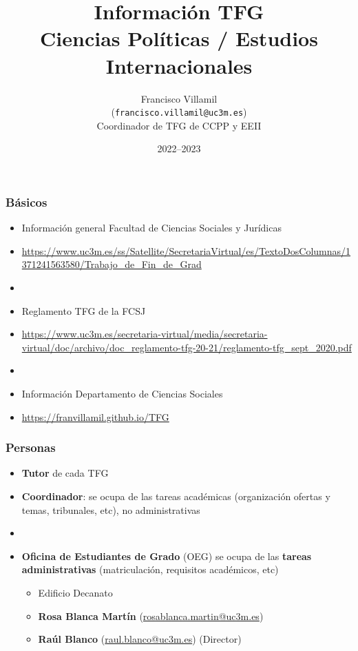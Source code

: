 \documentclass[utf8, xcolor=dvipsnames]{beamer}
\title[]{Información TFG\\Ciencias Políticas / Estudios Internacionales}
\author[]{Francisco Villamil\\(\texttt{francisco.villamil@uc3m.es})\\Coordinador de TFG de CCPP y EEII}
\date[]{2022--2023}
\begin{document}
\begin{frame}
  \titlepage
\end{frame}


\begin{frame}
\frametitle{Básicos}
\centering

\begin{itemize}
  \item Información general Facultad de Ciencias Sociales y Jurídicas
  \item[] {\footnotesize \url{https://www.uc3m.es/ss/Satellite/SecretariaVirtual/es/TextoDosColumnas/1371241563580/Trabajo_de_Fin_de_Grad}}
  \item[]
  \item Reglamento TFG de la FCSJ
  \item[] {\footnotesize \url{https://www.uc3m.es/secretaria-virtual/media/secretaria-virtual/doc/archivo/doc_reglamento-tfg-20-21/reglamento-tfg_sept_2020.pdf}}
  \item[]
  \item Información Departamento de Ciencias Sociales
  \item[] {\footnotesize \url{https://franvillamil.github.io/TFG}}
\end{itemize}

\end{frame}

\begin{frame}
\frametitle{Personas}
\centering

\begin{itemize}
  \item \textbf{Tutor} de cada TFG
  \item \textbf{Coordinador}: se ocupa de las tareas académicas (organización ofertas y temas, tribunales, etc), no administrativas
  \item[]
  \item \textbf{Oficina de Estudiantes de Grado} (OEG) se ocupa de las \textbf{tareas administrativas} (matriculación, requisitos académicos, etc)
  \begin{itemize}
    \item Edificio Decanato
    \item \textbf{Rosa Blanca Martín} (\url{rosablanca.martin@uc3m.es})
    \item \textbf{Raúl Blanco} (\url{raul.blanco@uc3m.es}) (Director)
  \end{itemize}
\end{itemize}

\end{frame}
\end{document}
